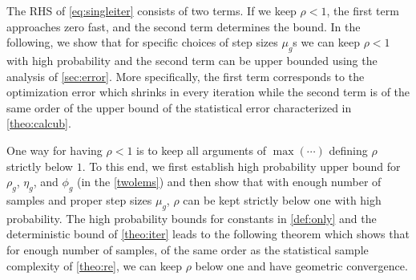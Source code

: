 The RHS of \cref{eq:singleiter} consists of two terms.
If we keep $\rho < 1$, the first term approaches zero fast, and the second term determines the bound. 
In the following, we show that for specific choices of step sizes $\mu_g$s we can keep $\rho < 1$ with high probability and the second term can be upper bounded using the analysis of \cref{sec:error}.
More specifically, the first term corresponds to the optimization error which shrinks in every iteration while the second term is of the same order of the upper bound of the statistical error characterized in \cref{theo:calcub}.

One way for having $\rho < 1$ is to keep all arguments of $\max(\cdots)$  defining $\rho$ strictly below $1$. %
To this end, we first establish high probability upper bound for $\rho_g$, $\eta_g$, and $\phi_g$ (in the \cref{twolems}) and then show that with enough number of samples and proper step sizes $\mu_g$, $\rho$ can be kept strictly below one with high probability. %
The high probability bounds for constants in \cref{def:only} and the deterministic bound of \cref{theo:iter} leads to the following theorem which shows that for enough number of samples, of the same order as the statistical sample complexity of  \cref{theo:re}, we can keep $\rho$ below one and have geometric convergence.





